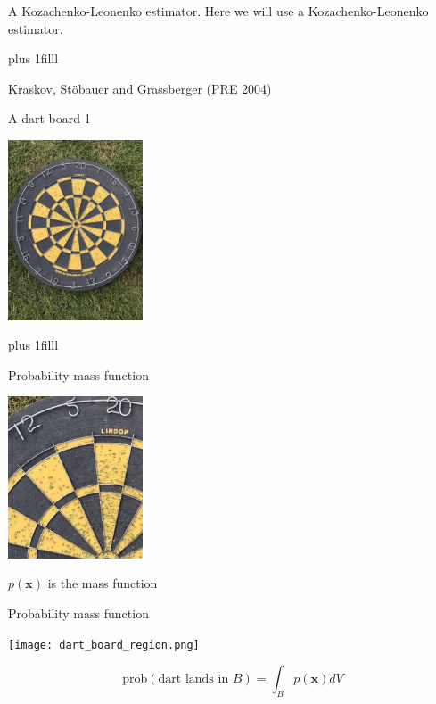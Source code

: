 \documentclass{beamer}
\newcommand{\btVFill}{\vskip0pt plus 1filll}
\begin{document}
\begin{frame}{A Kozachenko-Leonenko estimator.}
\vskip 3cm
  Here we will use a Kozachenko-Leonenko estimator.

  \btVFill
  \begin{flushright}
    \color{gray}
    \tiny{Kraskov, St\"{o}bauer and Grassberger (PRE 2004)}
    \color{black}
\end{flushright}
\end{frame}


\begin{frame}{A dart board 1}
\color{reddish}
\begin{center}
\includegraphics[width=4cm]{dart_board.jpg}
\end{center}
\color{black}
\btVFill
\color{gray}
\color{black}
\end{frame}

\begin{frame}{Probability mass function}
\color{reddish}
\begin{center}
\includegraphics[width=4cm]{dart_board_zoom.png}
\end{center}
\begin{center}
\color{black}
$p(\mathbf{x})$ is the mass function
\end{center}
\color{black}
\end{frame}


\begin{frame}{Probability mass function}
\begin{center}
\texttt{[image: dart\_board\_region.png]}
\end{center}
\color{dark}
$$\mbox{prob}(\mbox{dart lands in }B)=\int_B p(\mathbf{x})dV$$
\color{black}
\end{frame}
\end{document}
